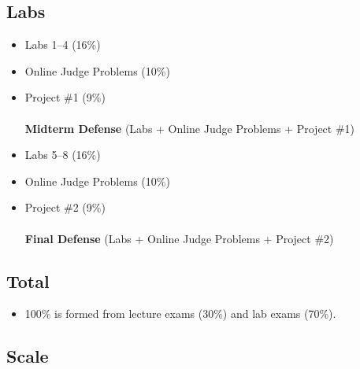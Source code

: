 \documentclass[12pt,a4paper,oneside]{article}
\begin{document}
        \subsection{Labs}

            \begin{itemize}
                \item Labs 1--4 (16\%)
                \item Online Judge Problems (10\%)
                \item Project \#1 (9\%)\\\\
                    \textbf{Midterm Defense} (Labs + Online Judge Problems + Project \#1)\\
                \item Labs 5--8 (16\%)
                \item Online Judge Problems (10\%)
                \item Project \#2 (9\%)\\\\
                    \textbf{Final Defense} (Labs + Online Judge Problems + Project \#2)\\
            \end{itemize}
 
        \subsection{Total}

            \begin{itemize}
                \item 100\% is formed from lecture exams (30\%) and lab exams (70\%).
            \end{itemize}

        \subsection{Scale}
    
\end{document}
